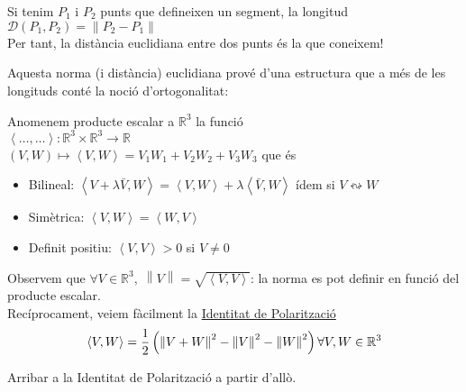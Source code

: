 \documentclass[../main.tex]{subfiles}
\begin{document}
\begin{demostracio}
\begin{center}
		\end{center}
		Si tenim $P_1\text{ i }P_2$ punts que defineixen un segment, la longitud $\mathcal{D}\left(P_1, P_2\right) = \left\lVert P_2-P_1\right\rVert$\\
		Per tant, la distància euclidiana entre dos punts és la que coneixem!
	\end{demostracio}
	Aquesta norma (i distància) euclidiana prové d'una estructura que a més de les longituds conté la
	noció d'ortogonalitat:
	\begin{definicio}
	    Anomenem producte escalar a $\mathbb{R}^3$ la funció\\
	    $\left\langle\dots, \dots\right\rangle: \mathbb{R}^3 \times \mathbb{R}^3 \to \mathbb{R}$\\
	    $\left(V, W\right) \mapsto \left\langle V, W\right\rangle = V_1W_1 + V_2W_2 + V_3W_3$
	    que és
	    \begin{itemize}
	        \item Bilineal: $\left\langle V+\lambda \bar{V}, W\right\rangle = \left\langle V, W\right\rangle + \lambda\left\langle \bar{V}, W\right\rangle$ ídem si $V \leftrightsquigarrow W$
	        \item Simètrica: $\left\langle V, W\right\rangle = \left\langle W, V\right\rangle$
	        \item Definit positiu: $\left\langle V, V\right\rangle > 0$ si $V \neq 0$
	    \end{itemize}
	\end{definicio}
	Observem que $\forall V \in \mathbb{R}^3,\;\left\lVert V\right\rVert = \sqrt{\left\langle V, V\right\rangle}$:
	la norma es pot definir en funció del producte escalar.\\
	Recíprocament, veiem fàcilment la \underline{Identitat de Polarització}
	\begin{displaymath}
	    \left\langle V, W\right\rangle = \frac{1}{2}\left(\left\lVert V+W\right\rVert^2 - \left\lVert V\right\rVert^2 - \left\lVert W\right\rVert^2\right)\\
	    \forall V, W \in \mathbb{R}^3
	\end{displaymath}
	\begin{exercici}
	    Arribar a la Identitat de Polarització a partir d'allò.
	\end{exercici}
\end{document}
